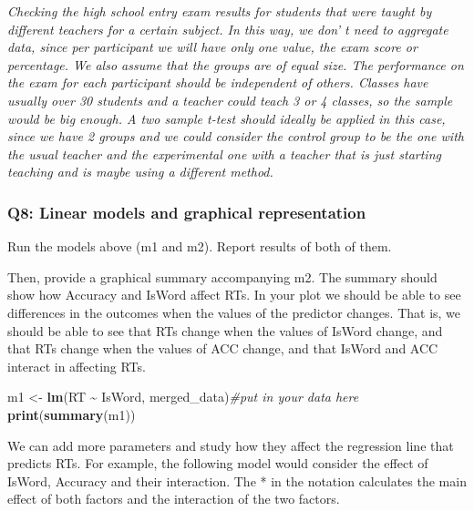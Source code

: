 \documentclass[
]{article}
\newenvironment{Shaded}{\begin{snugshade}}{\end{snugshade}}
\newcommand{\CommentTok}[1]{\textcolor[rgb]{0.56,0.35,0.01}{\textit{#1}}}
\newcommand{\FunctionTok}[1]{\textcolor[rgb]{0.13,0.29,0.53}{\textbf{#1}}}
\newcommand{\NormalTok}[1]{#1}
\newcommand{\OtherTok}[1]{\textcolor[rgb]{0.56,0.35,0.01}{#1}}
\newcommand{\SpecialCharTok}[1]{\textcolor[rgb]{0.81,0.36,0.00}{\textbf{#1}}}
\begin{document}
\emph{Checking the high school entry exam results for students that were
taught by different teachers for a certain subject. In this way, we don'
t need to aggregate data, since per participant we will have only one
value, the exam score or percentage. We also assume that the groups are
of equal size. The performance on the exam for each participant should
be independent of others. Classes have usually over 30 students and a
teacher could teach 3 or 4 classes, so the sample would be big enough. A
two sample t-test should ideally be applied in this case, since we have
2 groups and we could consider the control group to be the one with the
usual teacher and the experimental one with a teacher that is just
starting teaching and is maybe using a different method.}

\hypertarget{q8-linear-models-and-graphical-representation}{%
\subsubsection{Q8: Linear models and graphical
representation}\label{q8-linear-models-and-graphical-representation}}

Run the models above (m1 and m2). Report results of both of them.

Then, provide a graphical summary accompanying m2. The summary should
show how Accuracy and IsWord affect RTs. In your plot we should be able
to see differences in the outcomes when the values of the predictor
changes. That is, we should be able to see that RTs change when the
values of IsWord change, and that RTs change when the values of ACC
change, and that IsWord and ACC interact in affecting RTs.

\begin{Shaded}
\begin{Highlighting}[]
\NormalTok{m1 }\OtherTok{\textless{}{-}} \FunctionTok{lm}\NormalTok{(RT }\SpecialCharTok{\textasciitilde{}}\NormalTok{ IsWord, merged\_data)}\CommentTok{\#put in your data here}
\FunctionTok{print}\NormalTok{(}\FunctionTok{summary}\NormalTok{(m1))}
\end{Highlighting}
\end{Shaded}

We can add more parameters and study how they affect the regression line
that predicts RTs. For example, the following model would consider the
effect of IsWord, Accuracy and their interaction. The * in the notation
calculates the main effect of both factors and the interaction of the
two factors.
\end{document}
